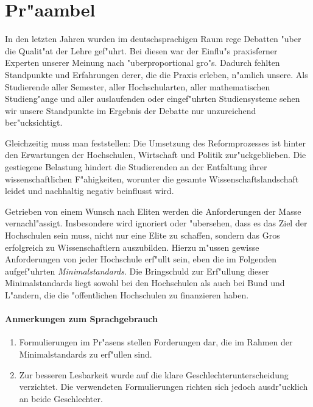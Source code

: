 \section{Pr"aambel}

In den letzten Jahren wurden im deutschsprachigen Raum rege
Debatten "uber die Qualit"at der Lehre gef"uhrt.
Bei diesen war der Einflu"s praxisferner Experten unserer Meinung nach "uberproportional gro"s.
Dadurch fehlten Standpunkte und Erfahrungen derer, die
die Praxis erleben, n"amlich unsere. Als Studierende
aller Semester, aller Hochschularten, aller mathematischen Studieng"ange
und aller auslaufenden oder eingef"uhrten Studiensysteme sehen
wir unsere Standpunkte im Ergebnis der Debatte nur unzureichend
ber"ucksichtigt.

Gleichzeitig muss man feststellen: Die Umsetzung des Reformprozesses
ist hinter den Erwartungen der Hochschulen, Wirtschaft und Politik
zur"uckgeblieben. Die gestiegene Belastung hindert die Studierenden
an der Entfaltung ihrer wissenschaftlichen F"ahigkeiten, worunter
die gesamte Wissenschaftslandschaft leidet und nachhaltig negativ
beinflusst wird.

Getrieben von einem Wunsch nach Eliten werden die Anforderungen der
Masse vernachl"assigt. Insbesondere wird ignoriert oder "ubersehen,
dass es das Ziel der Hochschulen sein muss, nicht nur eine Elite zu
schaffen, sondern das Gros erfolgreich zu Wissenschaftlern auszubilden.
Hierzu m"ussen gewisse Anforderungen von jeder Hochschule erf"ullt
sein, eben die im Folgenden aufgef"uhrten \emph{Minimalstandards}.
Die Bringschuld zur Erf"ullung dieser Minimalstandards liegt sowohl
bei den Hochschulen als auch bei Bund und L"andern, die die
"offentlichen Hochschulen zu finanzieren haben.

\paragraph{Anmerkungen zum Sprachgebrauch}\begin{enumerate}
\item Formulierungen im Pr"asens stellen Forderungen dar, die im
	Rahmen der Minimalstandards zu erf"ullen sind.
\item Zur besseren Lesbarkeit wurde auf die klare Geschlechterunterscheidung
	verzichtet. Die verwendeten Formulierungen richten sich
	jedoch ausdr"ucklich an beide Geschlechter.
\end{enumerate}
